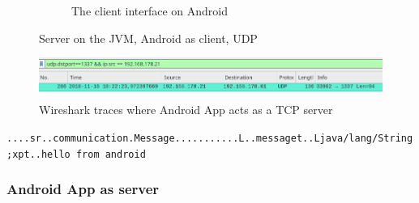 \begin{figure}[H]
\begin{subfigure}{.49\textwidth}
		\caption{The client interface on Android}
	\end{subfigure}%
	\caption{Server on the JVM, Android as client, UDP}
	\label{fig:androidClientUDP}
\end{figure}

\begin{figure}[H]
	\includegraphics[width=1\linewidth]{images/task3/subtask2/wireshark/jvmServerUDP.png}
	\caption{Wireshark traces where Android App acts as a TCP server}
	\label{fig:wire3}
\end{figure}


\texttt{....sr..communication.Message...........L..messaget..Ljava/lang/String;xpt..hello from android}


\subsubsection{Android App as server}


